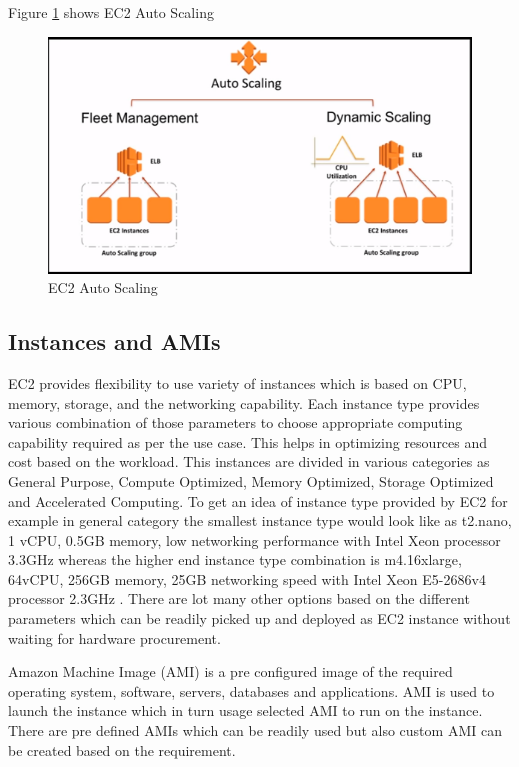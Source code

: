 Figure \ref{f:ec2-auto-scaling} shows EC2 Auto Scaling
\begin{figure}[!ht]
  \centering\includegraphics[width=\columnwidth]{images/ec2AutoScaling.PNG}
  \caption{EC2 Auto Scaling \cite{www-aws-ec2autoscaling}}\label{f:ec2-auto-scaling}
\end{figure}

\subsection{Instances and AMIs}
EC2 provides flexibility to use variety of instances which is based on CPU, memory, storage, and the networking capability. Each instance type provides various combination of those parameters to choose appropriate computing capability required as per the use case. This helps in optimizing resources and cost based on the workload. This instances are divided in various categories as General Purpose, Compute Optimized, Memory Optimized, Storage Optimized and Accelerated Computing. To get an idea of instance type provided by EC2 for example in general category the smallest instance type would look like as t2.nano, 1 vCPU, 0.5GB memory, low networking performance with Intel Xeon processor 3.3GHz whereas the higher end instance type combination is m4.16xlarge, 64vCPU, 256GB memory, 25GB networking speed with Intel Xeon E5-2686v4 processor 2.3GHz \cite{www-aws-ec2instance}. There are lot many other options based on the different parameters which can be readily picked up and deployed as EC2 instance without waiting for hardware procurement.

Amazon Machine Image (AMI) \cite{www-aws-ec2instance} is a pre configured image of the required operating system, software, servers, databases and applications. AMI is used to launch the instance which in turn usage selected AMI to run on the instance. There are pre defined AMIs which can be readily used but also custom AMI can be created based on the requirement.

